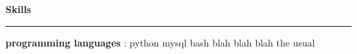 \textbf{Skills} 
 \par\noindent\rule{\textwidth}{0.2pt} 
\noindent 
 {\textbf{programming languages} : {python mysql bash blah blah blah the usual}} \\ 

